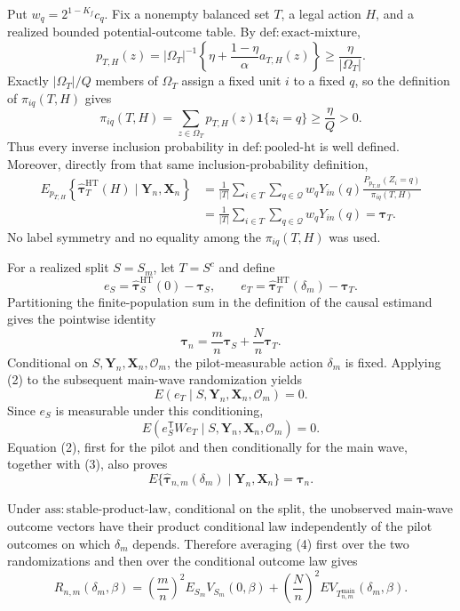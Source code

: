 Put \(w_q=2^{1-K_f}c_q\).  Fix a nonempty balanced set \(T\), a legal action \(H\), and a realized bounded potential-outcome table.  By \(\mathrm{def{:}exact\text{-}mixture}\),
\[
p_{T,H}(z)
=|\Omega_T|^{-1}\left\{\eta+\frac{1-\eta}{\alpha}a_{T,H}(z)\right\}
\geq \frac{\eta}{|\Omega_T|}.
\]
Exactly \(|\Omega_T|/Q\) members of \(\Omega_T\) assign a fixed unit \(i\) to a fixed \(q\), so the definition of \(\pi_{iq}(T,H)\) gives
\[
\pi_{iq}(T,H)
=\sum_{z\in\Omega_T}p_{T,H}(z)\mathbf 1\{z_i=q\}
\geq \frac{\eta}{Q}>0.
\tag{1}
\]
Thus every inverse inclusion probability in \(\mathrm{def{:}pooled\text{-}ht}\) is well defined.  Moreover, directly from that same inclusion-probability definition,
\[
\begin{aligned}
E_{p_{T,H}}\!\left\{
\widehat{\boldsymbol\tau}^{\mathrm{HT}}_T(H)
\mid\mathbf Y_n,\mathbf X_n\right\}
&=\frac1{|T|}\sum_{i\in T}\sum_{q\in\mathcal Q}
w_qY_{in}(q)
\frac{P_{p_{T,H}}(Z_i=q)}{\pi_{iq}(T,H)}\\
&=\frac1{|T|}\sum_{i\in T}\sum_{q\in\mathcal Q}w_qY_{in}(q)
=\boldsymbol\tau_T.
\end{aligned}
\tag{2}
\]
No label symmetry and no equality among the \(\pi_{iq}(T,H)\) was used.

For a realized split \(S=S_m\), let \(T=S^c\) and define
\[
e_S=\widehat{\boldsymbol\tau}^{\mathrm{HT}}_S(0)-\boldsymbol\tau_S,
\qquad
e_T=\widehat{\boldsymbol\tau}^{\mathrm{HT}}_T(\delta_m)-\boldsymbol\tau_T.
\]
Partitioning the finite-population sum in the definition of the causal estimand gives the pointwise identity
\[
\boldsymbol\tau_n=\frac mn\boldsymbol\tau_S+\frac Nn\boldsymbol\tau_T.
\tag{3}
\]
Conditional on \(S,\mathbf Y_n,\mathbf X_n,\mathcal O_m\), the pilot-measurable action \(\delta_m\) is fixed.  Applying (2) to the subsequent main-wave randomization yields
\[
E(e_T\mid S,\mathbf Y_n,\mathbf X_n,\mathcal O_m)=0.
\]
Since \(e_S\) is measurable under this conditioning,
\[
E(e_S^{\mathsf T}We_T\mid S,\mathbf Y_n,\mathbf X_n,\mathcal O_m)=0.
\tag{4}
\]
Equation (2), first for the pilot and then conditionally for the main wave, together with (3), also proves
\[
E\{\widehat{\boldsymbol\tau}_{n,m}(\delta_m)
\mid\mathbf Y_n,\mathbf X_n\}=\boldsymbol\tau_n.
\tag{5}
\]

Under \(\mathrm{ass{:}stable\text{-}product\text{-}law}\), conditional on the split, the unobserved main-wave outcome vectors have their product conditional law independently of the pilot outcomes on which \(\delta_m\) depends.  Therefore averaging (4) first over the two randomizations and then over the conditional outcome law gives
\[
R_{n,m}(\delta_m,\beta)
=\left(\frac mn\right)^2E_{S_m}V_{S_m}(0,\beta)
+\left(\frac Nn\right)^2
E V_{T_{n,m}^{\mathrm{main}}}(\delta_m,\beta).
\tag{6}
\]


